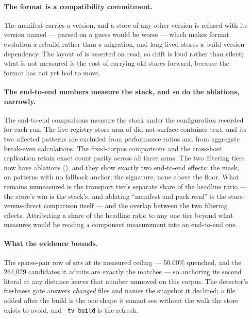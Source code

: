 \documentclass[11pt,letterpaper]{article}
\begin{document}
\paragraph{The format is a compatibility commitment.}
The manifest carries a version, and a store of any other version is refused
with its version named --- parsed on a guess would be worse --- which makes
format evolution a rebuild rather than a migration, and long-lived stores a
build-version dependency. The layout of  is asserted on
read, so drift is loud rather than silent; what is not measured is the cost
of carrying old stores forward, because the format has not yet had to move.

\paragraph{The end-to-end numbers measure the stack, and so do the
ablations, narrowly.}
The end-to-end comparisons measure the stack under the configuration
recorded for each run. The live-registry store arm of  did not
surface container text, and its two affected patterns are excluded from
performance ratios and from aggregate break-even calculations. The fixed-corpus
comparisons and the cross-host replication retain exact count parity across all
three arms. The two filtering tiers now have ablations
(), and they show exactly two end-to-end effects: the
mask, on patterns with no fallback anchor; the signature, none above the
floor. What remains unmeasured is the transport tier's separate share of
the headline ratio --- the store's win is the stack's, and ablating
``manifest and pack read'' is the store-versus-direct comparison itself
--- and the overlap between the two filtering effects. Attributing a
share of the headline ratio to any one tier beyond what
 measures would be reading a component measurement
into an end-to-end one.

\paragraph{What the evidence bounds.}
The sparse-pair row of  sits at its measured ceiling ---
50.00\% quenched, and the 264{,}029 candidates it admits are exactly the
matches --- so anchoring its second literal at any distance leaves that
number unmoved on this corpus. The detector's freshness gate answers
\emph{changed} files and names the snapshot it declined; a file added
after the build is the one shape it cannot see without the walk the store
exists to avoid, and \texttt{--tv-build} is the refresh.
\end{document}
